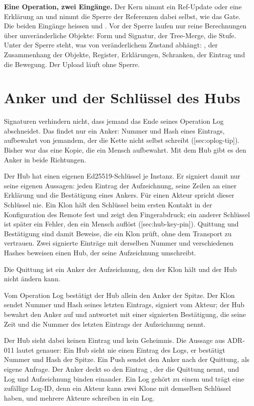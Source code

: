 \startinfobox
{\bf Eine Operation, zwei Eingänge.}
Der Kern nimmt ein Ref-Update oder eine Erklärung an und nimmt die Sperre der Referenzen dabei
selbst, wie das Gate.
Die beiden Eingänge heissen  und .
Vor der Sperre laufen nur reine Berechnungen über unveränderliche Objekte: Form und Signatur, der
Tree-Merge, die Stufe.
Unter der Sperre steht, was von veränderlichem Zustand abhängt: , der Zusammenhang
der Objekte, Register, Erklärungen, Schranken, der Eintrag und die Bewegung.
Der Upload läuft ohne Sperre.
\stopinfobox

\section[sec:hub-anchor]{Anker und der Schlüssel des Hubs}

Signaturen verhindern nicht, dass jemand das Ende seines Operation Log abschneidet.
Das findet nur ein Anker: Nummer und Hash eines Eintrags, aufbewahrt von jemandem, der die Kette
nicht selbst schreibt ([sec:oplog-tip]).
Bisher war das eine Kopie, die ein Mensch aufbewahrt.
Mit dem Hub gibt es den Anker in beide Richtungen.

Der Hub hat einen eigenen Ed25519-Schlüssel je Instanz.
Er signiert damit nur seine eigenen Aussagen: jeden Eintrag der Aufzeichnung, seine Zeilen an
einer Erklärung und die Bestätigung eines Ankers.
Für einen Akteur spricht dieser Schlüssel nie.
Ein Klon hält den Schlüssel beim ersten Kontakt in der Konfiguration des Remote fest und zeigt den
Fingerabdruck; ein anderer Schlüssel ist später ein Fehler, den ein Mensch auflöst
([sec:hub-key-pin]).
Quittung und Bestätigung sind damit Beweise, die ein Klon prüft, ohne dem Transport zu vertrauen.
Zwei signierte Einträge mit derselben Nummer und verschiedenen Hashes beweisen einen Hub, der
seine Aufzeichnung umschreibt.

\startitemize
\item Die Quittung ist ein Anker der Aufzeichnung, den der Klon hält und der Hub nicht ändern
kann.
\item Vom Operation Log bestätigt der Hub allein den Anker der Spitze.
Der Klon sendet Nummer und Hash seines letzten Eintrags, signiert vom Akteur; der Hub bewahrt
den Anker auf und antwortet mit einer signierten Bestätigung, die seine Zeit und die Nummer des
letzten Eintrags der Aufzeichnung nennt.
\stopitemize

Der Hub sieht dabei keinen Eintrag und kein Geheimnis.
Die Aussage aus ADR-011 lautet genauer: Ein Hub sieht nie einen Eintrag des Logs, er bestätigt
Nummer und Hash der Spitze.
Ein Push sendet den Anker nach der Quittung, als eigene Anfrage.
Der Anker deckt so den Eintrag , der die Quittung nennt, und Log und Aufzeichnung
binden einander.
Ein Log gehört zu einem  und trägt eine zufällige Log-ID, denn ein Akteur kann zwei
Klone mit demselben Schlüssel haben, und mehrere Akteure schreiben in ein Log.

